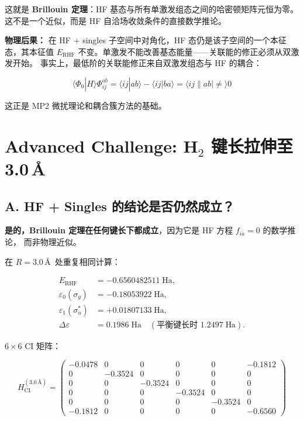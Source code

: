 \documentclass[fontset=mac]{ctexart}
\newcommand{\braket}[2]{\langle #1|#2\rangle}
\begin{document}
这就是 \textbf{Brillouin 定理}：HF 基态与所有单激发组态之间的哈密顿矩阵元恒为零。
这不是一个近似，而是 HF 自洽场收敛条件的直接数学推论。

\textbf{物理后果：} 在 HF + singles 子空间中对角化，HF 态仍是该子空间的一个本征态，其本征值 $E_{\text{RHF}}$ 不变。单激发不能改善基态能量——关联能的修正必须从双激发开始。
事实上，最低阶的关联能修正来自双激发组态与 HF 的耦合：

\begin{equation}
\braket{\Phi_0}{\hat{H}}{\Phi_{ij}^{ab}} = \braket{ij}{ab} - \braket{ij}{ba} = \braket{ij\|ab} \neq 0
\end{equation}

这正是 MP2 微扰理论和耦合簇方法的基础。

\newpage

\section*{Advanced Challenge: H$_2$ 键长拉伸至 3.0\,\AA}

\subsection*{A. HF + Singles 的结论是否仍然成立？}

\textbf{是的，Brillouin 定理在任何键长下都成立}，因为它是 HF 方程 $f_{ia}=0$ 的数学推论，
而非物理近似。

在 $R=3.0$\,\AA\, 处重复相同计算：

\begin{align*}
    E_{\text{RHF}} &= -0.6560482511\;\text{Ha}, \\
    \varepsilon_0(\sigma_g) &= -0.18053922\;\text{Ha}, \\
    \varepsilon_1(\sigma_u^*) &= +0.01807133\;\text{Ha}, \\
    \Delta\varepsilon &= 0.1986\;\text{Ha} \quad (\text{平衡键长时 } 1.2497\;\text{Ha}).
\end{align*}

$6\times 6$ CI 矩阵：

\begin{equation}
H_{\text{CI}}^{(3.0\,\text{\AA})} = \begin{pmatrix}
-0.0478 &  0      &  0      &  0      &  0      & -0.1812 \\
 0      & -0.3524 &  0      &  0      &  0      &  0      \\
 0      &  0      & -0.3524 &  0      &  0      &  0      \\
 0      &  0      &  0      & -0.3524 &  0      &  0      \\
 0      &  0      &  0      &  0      & -0.3524 &  0      \\
-0.1812 &  0      &  0      &  0      &  0      & -0.6560
\end{pmatrix}
\end{equation}
\end{document}
